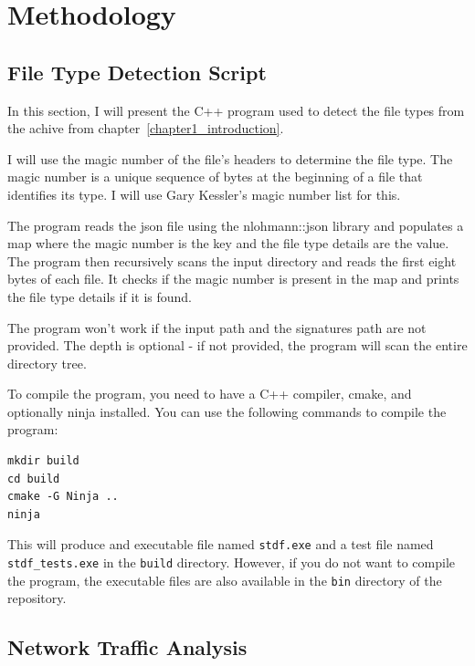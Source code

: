 \documentclass[pdflatex,sn-mathphys-num]{sn-jnl}
\begin{document}
\section{Methodology}

\subsection{File Type Detection Script}\label{ftds}

\par In this section, I will present the C++ program used to detect the file types from the achive from chapter~\ref{chapter1_introduction}.

\par I will use the magic number of the file's headers to determine the file type. The magic number is a unique sequence
of bytes at the beginning of a file that identifies its type. I will use Gary Kessler's magic number list\cite{filesigs}
for this.

\par The program reads the json file using the nlohmann::json library\cite{nlohmann_json} and populates a map where
the magic number is the key and the file type details are the value. The program then recursively scans the input
directory and reads the first eight bytes of each file. It checks if the magic number is present in the map and prints
the file type details if it is found.

\par The program won't work if the input path and the signatures path are not provided. The depth is optional \-- if not
provided, the program will scan the entire directory tree.

\par To compile the program, you need to have a C++ compiler, cmake, and optionally ninja installed. You can use the
following commands to compile the program:

\begin{lstlisting}[style=bashstyle]
mkdir build
cd build
cmake -G Ninja ..
ninja
\end{lstlisting}

\par This will produce and executable file named \texttt{stdf.exe} and a test file named \texttt{stdf\_tests.exe} in the
\texttt{build} directory. However, if you do not want to compile the program, the executable files are also available in
the \texttt{bin} directory of the repository.

\subsection{Network Traffic Analysis}
\end{document}
